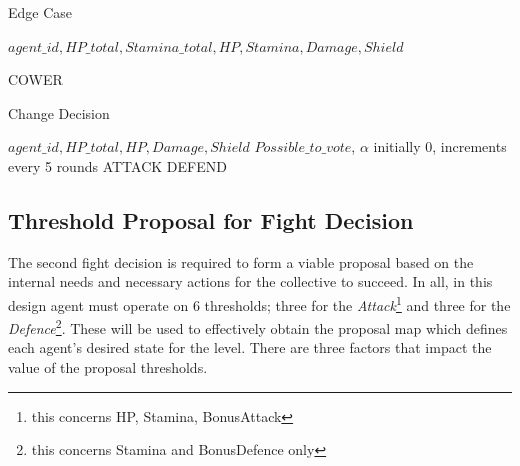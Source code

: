 

\begin{algorithm}
\caption{Edge Case}\label{alg:9}
\begin{algorithmic} 
\scriptsize
\Require $agent\_id, HP\_total,Stamina\_total, HP, Stamina, Damage, Shield$

\Return COWER
\EndIf
\end{algorithmic}
\end{algorithm}



\begin{algorithm}
\caption{Change Decision}\label{alg:10}
\begin{algorithmic} 
\scriptsize
\Require $agent\_id, HP\_total, HP, Damage, Shield$
\Ensure $Possible\_to\_vote$, $\alpha$ initially 0, increments every 5 rounds
\Return ATTACK
\Return DEFEND
\EndIf
\EndIf
\EndIf
\end{algorithmic}
\end{algorithm}

\pagebreak

\subsection{Threshold Proposal for Fight Decision}
    
    The second fight decision is required to form a viable proposal based on the internal needs and necessary actions for the collective to succeed. In all, in this design agent must operate on 6 thresholds; three for the \textit{Attack}\footnote{this concerns HP, Stamina, BonusAttack} and three for the \textit{Defence}\footnote{this concerns Stamina and BonusDefence only}. These will be used to effectively obtain the proposal map which defines each agent's desired state for the level. There are three factors that impact the value of the proposal thresholds.
    
